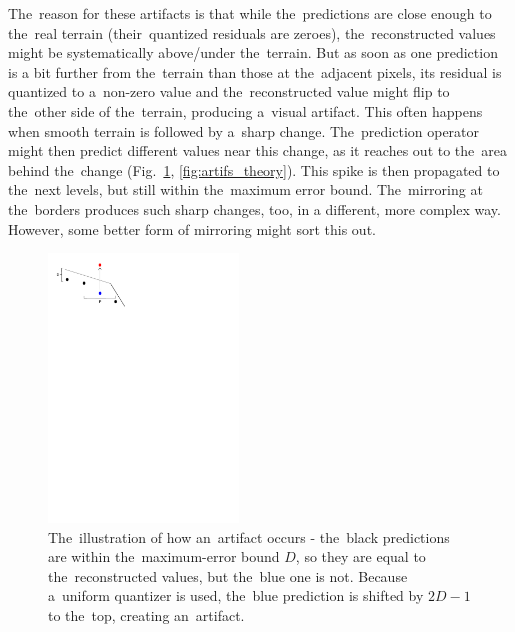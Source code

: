 The~reason for these artifacts is that while the~predictions are close enough to the~real terrain (their~quantized residuals are zeroes), the~reconstructed values might be systematically above/under the~terrain. But as soon as one prediction is a bit further from the~terrain than those at the~adjacent pixels, its residual is quantized to a~non-zero value and the~reconstructed value might flip to the~other side of the~terrain, producing a~visual artifact. This often happens when smooth terrain is followed by a~sharp change. The~prediction operator might then predict different values near this change, as it reaches out to the~area behind the~change (Fig.~\ref{fig:artifs_theory2}, \ref{fig:artifs_theory}). This spike is then propagated to the~next levels, but still within the~maximum error bound. The~mirroring at the~borders produces such sharp changes, too, in a different, more complex way. However, some better form of mirroring might sort this out.

\begin{figure}
	\includegraphics[trim={0 24cm 7cm 0}, clip, width=0.45\textwidth]{figures/artifs_theory.pdf}\centering
	\caption{The~illustration of how an~artifact occurs - the~black predictions are within the~maximum-error bound $D$, so they are equal to the~reconstructed values, but the~blue one is not. Because a~uniform quantizer is used, the~blue prediction is shifted by $2D - 1$ to the~top, creating an~artifact.}
	\label{fig:artifs_theory2}
\end{figure}

